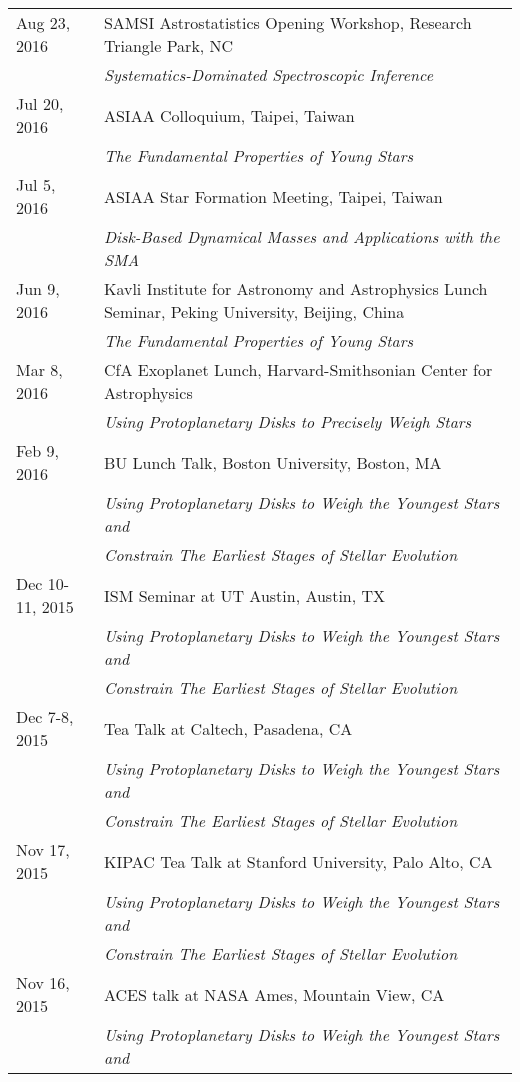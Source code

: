 \begin{longtable}{@{\hspace{10pt}}p{1.2in}l}
  Aug 23, 2016 & SAMSI Astrostatistics Opening Workshop, Research Triangle Park, NC \\
  & \emph{Systematics-Dominated Spectroscopic Inference} \\[\rowskip]
  Jul 20, 2016 & ASIAA Colloquium, Taipei, Taiwan \\
  & \emph{The Fundamental Properties of Young Stars} \\[\rowskip]
  Jul 5, 2016 & ASIAA Star Formation Meeting, Taipei, Taiwan \\
  & \emph{Disk-Based Dynamical Masses and Applications with the SMA} \\[\rowskip]
  Jun 9, 2016 & Kavli Institute for Astronomy and Astrophysics Lunch Seminar, Peking University, Beijing, China \\
  & \emph{The Fundamental Properties of Young Stars} \\[\rowskip]
  Mar 8, 2016 & CfA Exoplanet Lunch, Harvard-Smithsonian Center for Astrophysics \\
  & \emph{Using Protoplanetary Disks to Precisely Weigh Stars} \\[\rowskip]
  Feb 9, 2016 & BU Lunch Talk, Boston University, Boston, MA \\
  & \emph{Using Protoplanetary Disks to Weigh the Youngest Stars and} \\
  & \emph{Constrain The Earliest Stages of Stellar Evolution} \\[\rowskip]
  Dec 10-11, 2015 & ISM Seminar at UT Austin, Austin, TX \\
  & \emph{Using Protoplanetary Disks to Weigh the Youngest Stars and} \\
  & \emph{Constrain The Earliest Stages of Stellar Evolution} \\[\rowskip]
  Dec 7-8, 2015 & Tea Talk at Caltech, Pasadena, CA \\
  & \emph{Using Protoplanetary Disks to Weigh the Youngest Stars and} \\
  & \emph{Constrain The Earliest Stages of Stellar Evolution} \\[\rowskip]
  Nov 17, 2015 & KIPAC Tea Talk at Stanford University, Palo Alto, CA \\
  & \emph{Using Protoplanetary Disks to Weigh the Youngest Stars and} \\
  & \emph{Constrain The Earliest Stages of Stellar Evolution} \\[\rowskip]
  Nov 16, 2015 & ACES talk at NASA Ames, Mountain View, CA \\
  & \emph{Using Protoplanetary Disks to Weigh the Youngest Stars and} \\

\end{longtable}

